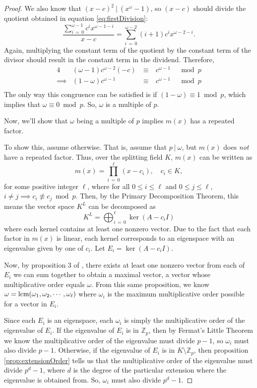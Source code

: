 \documentclass[12pt, a4paper, reqno]{amsart}
\newcommand\divides{\ | \ }
\newcommand\lcm[1]{\textup{lcm}(#1)}
\begin{document}
\begin{proof}
		We also know that $(x - c)^2 \divides (x^\omega - 1)$, so $(x - c)$ should divide the quotient obtained in equation \ref{eq:firstDivision}:
		\[
			\frac{\sum_{i\,=\,0}^{\omega-1} c^ix^{\omega - 1 - i}}{x - c} = \sum_{i\,=\,0}^{\omega - 2} (i+1)c^ix^{\omega - 2 - i}.
		\]
		Again, multiplying the constant term of the quotient by the constant term of the divisor should result in the constant term in the dividend. Therefore,
		\begin{alignat*}{4}
			         & (\omega - 1)c^{\omega - 2}(-c) \ & \equiv & \ c^{\omega - 1} & \mod{p} \\
			\implies & (1 - \omega)c^{\omega - 1}     \ & \equiv & \ c^{\omega - 1} & \mod{p} \\
		\end{alignat*}
		The only way this congruence can be satisfied is if $(1 - \omega) \equiv 1 \bmod{p}$, which implies that $\omega \equiv 0 \bmod{p}$. So, $\omega$ is a multiple of 
		$p$.
		
		Now, we'll show that $\omega$ being a multiple of $p$ implies $m(x)$ has a repeated factor.
		
		To show this, assume otherwise. That is, assume that $p \divides \omega$, but $m(x)$ does \emph{not} have a repeated factor. Thus, over the splitting field $K$, 
		$m(x)$ can be written as
		\[
			m(x) = \prod_{i\,=\,0}^{\ell} (x - c_i), \quad c_i \in K,
		\]
		for some positive integer $\ell$, where for all $0 \leq i \leq \ell$ and $0 \leq j \leq \ell$, $i \neq j \implies c_i \not\equiv c_j \bmod{p}$. Then, by the Primary 
		Decomposition Theorem, this means the vector space $K^L$ can be decomposed as
		\[
			K^L = \bigoplus_{i\,=\,0}^{\ell} \ker(A - c_iI)
		\]
		where each kernel contains at least one nonzero vector. Due to the fact that each factor in $m(x)$ is linear, each kernel corresponds to an 
		eigenspace with an eigenvalue given by one of $c_i$. Let $E_i = \ker(A - c_iI)$.
		
		Now, by proposition 3 of \citet{Mendivil2012}, there exists at least one nonzero vector from each of $E_i$ we can sum together to obtain a maximal vector, a vector 
		whose multiplicative order equals $\omega$. From this same proposition, we know $\omega = \lcm{\omega_1, \omega_2, \cdots, \omega_\ell}$ where $\omega_i$ is the 
		maximum multiplicative order possible for a vector in $E_i$. 
		
		Since each $E_i$ is an eigenspace, each $\omega_i$ is simply the multiplicative order of the eigenvalue of $E_i$. If the eigenvalue of $E_i$ is in $\mathds{Z}_p$, 
		then by Fermat's Little Theorem we know the multiplicative order of the eigenvalue must divide $p-1$, so $\omega_i$ must also divide $p-1$. Otherwise, if the 
		eigenvalue of $E_i$ is in $K \setminus \mathds{Z}_p$, then proposition \ref{prop:extensionOrder} tells us that the multiplicative order of the eigenvalue must 
		divide $p^d - 1$, where $d$ is the degree of the particular extension where the eigenvalue is obtained from. So, $\omega_i$ must also divide $p^d - 1$.
		

\end{proof}
\end{document}
